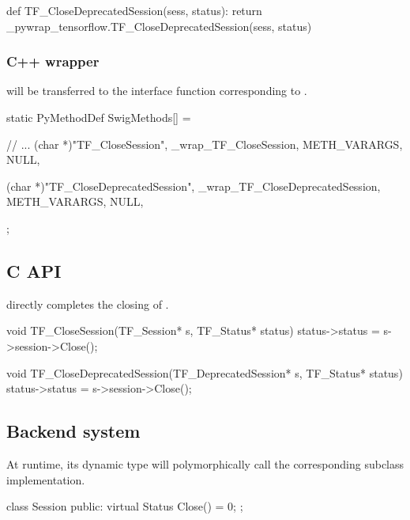\begin{content}
\begin{leftbar}
\begin{python}[caption={tensorflow/bazel-bin/tensorflow/python/pywrap\_tensorflow\_internal.py}]
def TF_CloseDeprecatedSession(sess, status):
  return _pywrap_tensorflow.TF_CloseDeprecatedSession(sess, status)
\end{python}
\end{leftbar}


\subsubsection{C++ wrapper}
 will be transferred to the  interface function corresponding to .

\begin{leftbar}
\begin{c++}[caption={tensorflow/bazel-bin/tensorflow/python/pywrap\_tensorflow\_internal.cc}]
static PyMethodDef SwigMethods[] = {
  // ...
  { (char *)"TF_CloseSession", 
    _wrap_TF_CloseSession, METH_VARARGS, NULL},

  { (char *)"TF_CloseDeprecatedSession", 
    _wrap_TF_CloseDeprecatedSession, METH_VARARGS, NULL},
};
\end{c++}
\end{leftbar}


\subsection{C API}
 directly completes the closing of .

\begin{leftbar}
\begin{c++}[caption={tensorflow/c/c\_api.c}]
void TF_CloseSession(TF_Session* s, TF_Status* status) {
  status->status = s->session->Close();
}

void TF_CloseDeprecatedSession(TF_DeprecatedSession* s, TF_Status* status) {
  status->status = s->session->Close();
}
\end{c++}
\end{leftbar}


\subsection{Backend system}
 At runtime, its dynamic type will polymorphically call the corresponding subclass implementation.

\begin{leftbar}
\begin{c++}[caption={tensorflow/core/common\_runtime/session.h}]
class Session {
public:
  virtual Status Close() = 0;
};
\end{c++}
\end{leftbar}

\end{content}


